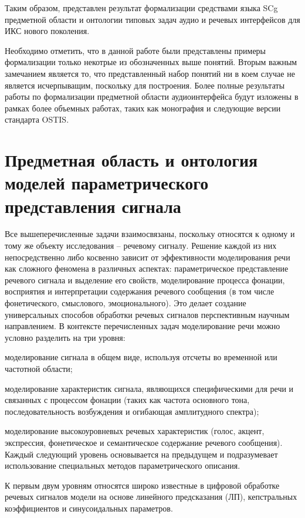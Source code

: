  Таким образом, представлен результат формализации средствами языка SCg предметной области и онтологии типовых задач аудио и речевых интерфейсов для ИКС нового поколения.

Необходимо отметить, что в данной работе были представлены примеры формализации только некотрые из обозначенных выше понятий. Вторым важным замечанием является то, что представленный набор понятий ни в коем случае не является исчерпыващим, поскольку для  построения. Более полные результаты работы по формализации предметной области аудиоинтерфейса будут изложены в рамках более объемных работах, таких как монография и следующие версии стандарта OSTIS.


\section{Предметная область и онтология моделей параметрического представления сигнала}

Все вышеперечисленные задачи взаимосвязаны, поскольку относятся к одному и тому же объекту исследования – речевому сигналу. Решение каждой из них непосредственно либо косвенно зависит от эффективности моделирования речи как сложного феномена в различных аспектах: параметрическое представление речевого сигнала и выделение его свойств, моделирование процесса фонации, восприятия и интерпретации содержания речевого сообщения (в том числе фонетического, смыслового, эмоционального). Это делает создание универсальных способов обработки речевых сигналов перспективным научным направлением.
В контексте перечисленных задач моделирование речи можно условно разделить на три уровня: 

\begin{textitemize}
    \item моделирование сигнала в общем виде, используя отсчеты во временной или частотной области; 
    \item моделирование характеристик сигнала, являющихся специфическими для речи и связанных с процессом фонации (таких как частота основного тона, последовательность возбуждения и огибающая амплитудного спектра); 
    \item моделирование высокоуровневых речевых характеристик (голос, акцент, экспрессия, фонетическое и семантическое содержание речевого сообщения).  Каждый следующий уровень основывается на предыдущем и подразумевает использование специальных методов параметрического описания.
\end{textitemize}

К первым двум уровням относятся широко известные в цифровой обработке речевых сигналов модели на основе линейного предсказания (ЛП), кепстральных коэффициентов и синусоидальных параметров.

